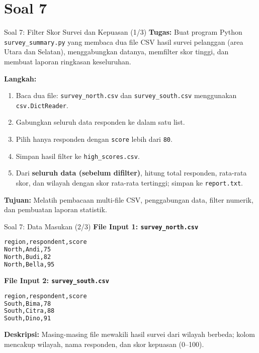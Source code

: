 \documentclass[aspectratio=169, table]{beamer}
\begin{document}
\section{Soal 7}
\begin{frame}[fragile]{Soal 7: Filter Skor Survei dan Kepuasan (1/3)}
\vspace{10pt}
\textbf{Tugas:}  
Buat program Python \texttt{survey\_summary.py} yang membaca dua file CSV hasil survei pelanggan (area Utara dan Selatan), menggabungkan datanya, memfilter skor tinggi, dan membuat laporan ringkasan keseluruhan.

\textbf{Langkah:}
\begin{enumerate}
  \item Baca dua file: \texttt{survey\_north.csv} dan \texttt{survey\_south.csv} menggunakan \texttt{csv.DictReader}.
  \item Gabungkan seluruh data responden ke dalam satu list.
  \item Pilih hanya responden dengan \texttt{score} lebih dari \texttt{80}.
  \item Simpan hasil filter ke \texttt{high\_scores.csv}.
  \item Dari \textbf{seluruh data (sebelum difilter)}, hitung total responden, rata-rata skor, dan wilayah dengan skor rata-rata tertinggi; simpan ke \texttt{report.txt}.
\end{enumerate}

\textbf{Tujuan:}  
Melatih pembacaan multi-file CSV, penggabungan data, filter numerik, dan pembuatan laporan statistik.
\end{frame}

\begin{frame}[fragile]{Soal 7: Data Masukan (2/3)}
\vspace{10pt}
\textbf{File Input 1: \texttt{survey\_north.csv}}
\begin{lstlisting}[language=bash,basicstyle=\ttfamily\small]
region,respondent,score
North,Andi,75
North,Budi,82
North,Bella,95
\end{lstlisting}

\textbf{File Input 2: \texttt{survey\_south.csv}}
\begin{lstlisting}[language=bash,basicstyle=\ttfamily\small]
region,respondent,score
South,Bima,78
South,Citra,88
South,Dino,91
\end{lstlisting}

\textbf{Deskripsi:}  
Masing-masing file mewakili hasil survei dari wilayah berbeda;  
kolom mencakup wilayah, nama responden, dan skor kepuasan (0–100).
\end{frame}
\end{document}
